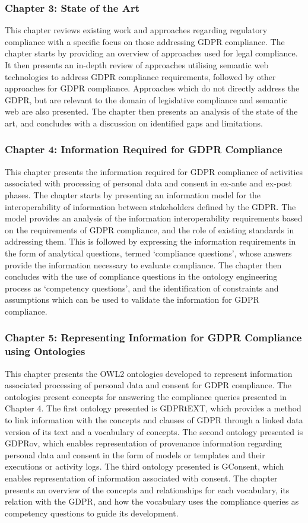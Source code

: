 \subsubsection{Chapter 3: State of the Art}
This chapter reviews existing work and approaches regarding regulatory compliance with a specific focus on those addressing GDPR compliance. The chapter starts by providing an overview of approaches used for legal compliance. It then presents an in-depth review of approaches utilising semantic web technologies to address GDPR compliance requirements, followed by other approaches for GDPR compliance. Approaches which do not directly address the GDPR, but are relevant to the domain of legislative compliance and semantic web are also presented. The chapter then presents an analysis of the state of the art, and concludes with a discussion on identified gaps and limitations.

\subsubsection{Chapter 4: Information Required for GDPR Compliance}
This chapter presents the information required for GDPR compliance of activities associated with processing of personal data and consent in ex-ante and ex-post phases.
The chapter starts by presenting an information model for the interoperability of information between stakeholders defined by the GDPR.
The model provides an analysis of the information interoperability requirements based on the requirements of GDPR compliance, and the role of existing standards in addressing them.
This is followed by expressing the information requirements in the form of analytical questions, termed `compliance questions', whose answers provide the information necessary to evaluate compliance. 
The chapter then concludes with the use of compliance questions in the ontology engineering process as `competency questions', and the identification of constraints and assumptions which can be used to validate the information for GDPR compliance.

\subsubsection{Chapter 5: Representing Information for GDPR Compliance using Ontologies}
This chapter presents the OWL2 ontologies developed to represent information associated processing of personal data and consent for GDPR compliance.
The ontologies present concepts for answering the compliance queries presented in Chapter 4. The first ontology presented is GDPRtEXT, which provides a method to link information with the concepts and clauses of GDPR through a linked data version of its text and a vocabulary of concepts. The second ontology presented is GDPRov, which enables representation of provenance information regarding personal data and consent in the form of models or templates and their executions or activity logs. The third ontology presented is GConsent, which enables representation of information associated with consent. The chapter presents an overview of the concepts and relationships for each vocabulary, its relation with the GDPR, and how the vocabulary uses the compliance queries as competency questions to guide its development.

